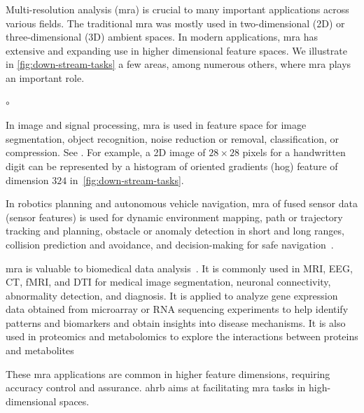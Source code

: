 \documentclass[final]{juliacon}
\begin{document}
Multi-resolution analysis ({\sc mra}) is crucial to many important
applications across various fields. The traditional {\sc mra} was
mostly used in two-dimensional (2D) or three-dimensional (3D) ambient
spaces. In modern applications, {\sc mra} has extensive and expanding
use in higher dimensional feature spaces.
%
We illustrate in \cref{fig:down-stream-tasks} a few areas, among
numerous others, where {\sc mra} plays an important role.
%
\begin{list}{$\circ$}{\leftmargin=5pt} 
\item In image and signal processing, {\sc mra} is used in feature
  space for image segmentation, object recognition, noise reduction or
  removal, classification, or compression. See \cite{shi2000,deng2001unsupervised,liu2014,tatarchenko2017,pitsianis2019,
    floros2022a}.  For example, a 2D image of $28\times 28$ pixels for
  a handwritten digit can be represented by a histogram of oriented
  gradients ({\sc hog}) feature of dimension $324$ in~\cref{fig:down-stream-tasks}.
%
\item In robotics planning and autonomous vehicle navigation, {\sc
    mra} of fused sensor data (sensor features) is used for dynamic
  environment mapping, path or trajectory tracking and planning,
  obstacle or anomaly detection in short and long ranges, collision
  prediction and avoidance, and decision-making for safe navigation~\cite{faverjon1984,khatib1987,hornung2013,seiwald2021}.
  
\item {\sc mra} is valuable to biomedical data analysis~\cite{vandermaaten2008,zheng2017,thetabulasapiensconsortium*2022}. It is
  commonly used in MRI, EEG, CT, fMRI, and DTI for medical image
  segmentation, neuronal connectivity, abnormality detection, and
  diagnosis. It is applied to analyze gene expression data obtained
  from microarray or RNA sequencing experiments to help identify
  patterns and biomarkers and obtain insights into disease
  mechanisms. It is also used in proteomics and metabolomics to
  explore the interactions between proteins and metabolites
\end{list}

These {\sc mra} applications are common in higher feature dimensions,
requiring accuracy control and assurance. {\sc ahrb} aims at
facilitating {\sc mra} tasks in high-dimensional spaces. 


%
%
%
 
%
\end{document}
